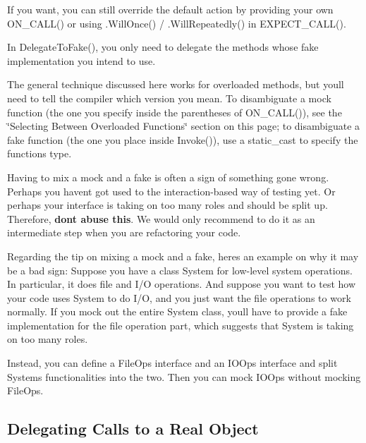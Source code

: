 \begin{DoxyItemize}
\item If you want, you can still override the default action by providing your own {\ttfamily O\+N\+\_\+\+C\+A\+L\+L()} or using {\ttfamily .Will\+Once()} / {\ttfamily .Will\+Repeatedly()} in {\ttfamily E\+X\+P\+E\+C\+T\+\_\+\+C\+A\+L\+L()}.
\item In {\ttfamily Delegate\+To\+Fake()}, you only need to delegate the methods whose fake implementation you intend to use.
\item The general technique discussed here works for overloaded methods, but you\textquotesingle{}ll need to tell the compiler which version you mean. To disambiguate a mock function (the one you specify inside the parentheses of {\ttfamily O\+N\+\_\+\+C\+A\+L\+L()}), see the \char`\"{}\+Selecting Between Overloaded Functions\char`\"{} section on this page; to disambiguate a fake function (the one you place inside {\ttfamily Invoke()}), use a {\ttfamily static\+\_\+cast} to specify the function\textquotesingle{}s type.
\item Having to mix a mock and a fake is often a sign of something gone wrong. Perhaps you haven\textquotesingle{}t got used to the interaction-\/based way of testing yet. Or perhaps your interface is taking on too many roles and should be split up. Therefore, {\bfseries don\textquotesingle{}t abuse this}. We would only recommend to do it as an intermediate step when you are refactoring your code.
\end{DoxyItemize}

Regarding the tip on mixing a mock and a fake, here\textquotesingle{}s an example on why it may be a bad sign\+: Suppose you have a class {\ttfamily System} for low-\/level system operations. In particular, it does file and I/O operations. And suppose you want to test how your code uses {\ttfamily System} to do I/O, and you just want the file operations to work normally. If you mock out the entire {\ttfamily System} class, you\textquotesingle{}ll have to provide a fake implementation for the file operation part, which suggests that {\ttfamily System} is taking on too many roles.

Instead, you can define a {\ttfamily File\+Ops} interface and an {\ttfamily I\+O\+Ops} interface and split {\ttfamily System}\textquotesingle{}s functionalities into the two. Then you can mock {\ttfamily I\+O\+Ops} without mocking {\ttfamily File\+Ops}.

\subsection*{Delegating Calls to a Real Object}

